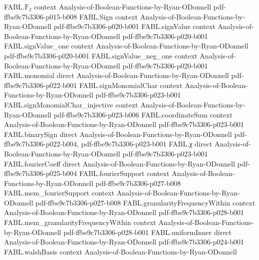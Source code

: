 \begin{theorem}
\label{FABL.spectralPNorm_one_eq_sum_abs}
\leanok
{}
\proofstep
  {FABL.𝔽₂}
  {context}
  {Analysis-of-Boolean-Functions-by-Ryan-ODonnell}
  {pdf-ffbe9c7b3306-p015-b008}
\proofstep
  {FABL.Sign}
  {context}
  {Analysis-of-Boolean-Functions-by-Ryan-ODonnell}
  {pdf-ffbe9c7b3306-p020-b001}
\proofstep
  {FABL.signValue}
  {context}
  {Analysis-of-Boolean-Functions-by-Ryan-ODonnell}
  {pdf-ffbe9c7b3306-p020-b001}
\proofstep
  {FABL.signValue_one}
  {context}
  {Analysis-of-Boolean-Functions-by-Ryan-ODonnell}
  {pdf-ffbe9c7b3306-p020-b001}
\proofstep
  {FABL.signValue_neg_one}
  {context}
  {Analysis-of-Boolean-Functions-by-Ryan-ODonnell}
  {pdf-ffbe9c7b3306-p020-b001}
\proofstep
  {FABL.monomial}
  {direct}
  {Analysis-of-Boolean-Functions-by-Ryan-ODonnell}
  {pdf-ffbe9c7b3306-p022-b001}
\proofstep
  {FABL.signMonomialChar}
  {context}
  {Analysis-of-Boolean-Functions-by-Ryan-ODonnell}
  {pdf-ffbe9c7b3306-p023-b001}
\proofstep
  {FABL.signMonomialChar_injective}
  {context}
  {Analysis-of-Boolean-Functions-by-Ryan-ODonnell}
  {pdf-ffbe9c7b3306-p023-b006}
\proofstep
  {FABL.coordinateSum}
  {context}
  {Analysis-of-Boolean-Functions-by-Ryan-ODonnell}
  {pdf-ffbe9c7b3306-p023-b001}
\proofstep
  {FABL.binarySign}
  {direct}
  {Analysis-of-Boolean-Functions-by-Ryan-ODonnell}
  {pdf-ffbe9c7b3306-p022-b004,
    pdf-ffbe9c7b3306-p023-b001}
\proofstep
  {FABL.χ}
  {direct}
  {Analysis-of-Boolean-Functions-by-Ryan-ODonnell}
  {pdf-ffbe9c7b3306-p023-b001}
\proofstep
  {FABL.fourierCoeff}
  {direct}
  {Analysis-of-Boolean-Functions-by-Ryan-ODonnell}
  {pdf-ffbe9c7b3306-p025-b004}
\proofstep
  {FABL.fourierSupport}
  {context}
  {Analysis-of-Boolean-Functions-by-Ryan-ODonnell}
  {pdf-ffbe9c7b3306-p027-b008}
\proofstep
  {FABL.mem_fourierSupport}
  {context}
  {Analysis-of-Boolean-Functions-by-Ryan-ODonnell}
  {pdf-ffbe9c7b3306-p027-b008}
\proofstep
  {FABL.granularityFrequencyWithin}
  {context}
  {Analysis-of-Boolean-Functions-by-Ryan-ODonnell}
  {pdf-ffbe9c7b3306-p028-b001}
\proofstep
  {FABL.mem_granularityFrequencyWithin}
  {context}
  {Analysis-of-Boolean-Functions-by-Ryan-ODonnell}
  {pdf-ffbe9c7b3306-p028-b001}
\proofstep
  {FABL.uniformInner}
  {direct}
  {Analysis-of-Boolean-Functions-by-Ryan-ODonnell}
  {pdf-ffbe9c7b3306-p024-b001}
\proofstep
  {FABL.walshBasis}
  {context}
  {Analysis-of-Boolean-Functions-by-Ryan-ODonnell}

\end{theorem}
